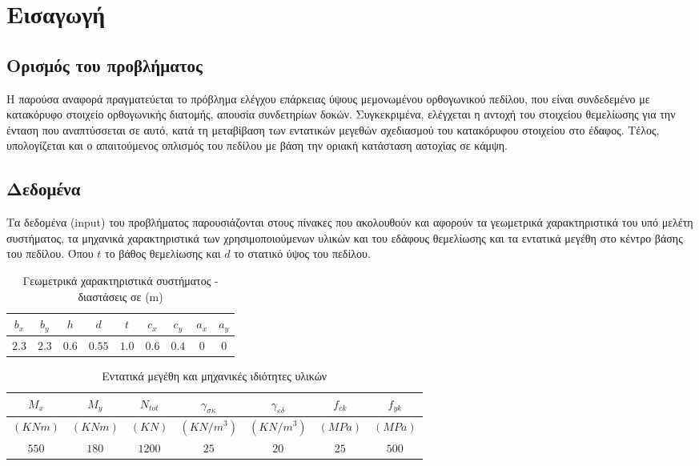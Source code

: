 \pagestyle{fancy}
\chapter{Εισαγωγή}
\section{Ορισμός του προβλήματος}
Η παρούσα αναφορά πραγματεύεται το πρόβλημα ελέγχου επάρκειας ύψους μεμονωμένου ορθογωνικού πεδίλου, που είναι συνδεδεμένο με κατακόρυφο στοιχείο ορθογωνικής διατομής, απουσία συνδετηρίων δοκών. Συγκεκριμένα, ελέγχεται η αντοχή του στοιχείου θεμελίωσης για την ένταση που αναπτύσσεται σε αυτό, κατά τη μεταβίβαση των εντατικών μεγεθών σχεδιασμού του κατακόρυφου στοιχείου στο έδαφος. Τέλος, υπολογίζεται και ο απαιτούμενος οπλισμός του πεδίλου με βάση την οριακή κατάσταση αστοχίας σε κάμψη.

\section{Δεδομένα}
Τα δεδομένα (\textlatin{input}) του προβλήματος παρουσιάζονται στους πίνακες που ακολουθούν και αφορούν τα γεωμετρικά χαρακτηριστικά του υπό μελέτη συστήματος, τα μηχανικά χαρακτηριστικά των χρησιμοποιούμενων υλικών και του εδάφους θεμελίωσης και τα εντατικά μεγέθη στο κέντρο βάσης του πεδίλου. Όπου $t$ το βάθος θεμελίωσης και $d$ το στατικό ύψος του πεδίλου.

\begin{table}[H]
\centering
\begin{tabular}{| c | c | c | c | c | c | c | c | c |}
\hline
$b_x$ & $b_y$ & $h$ & $d$ & $t$ & $c_x$ & $c_y$ & $a_x$ & $a_y$ \\
\hline
$2.3$ & $2.3$ & $0.6$ & $0.55$ & $1.0$ & $0.6$ & $0.4$ & $0$ & $0$ \\
\hline
\end{tabular}
\caption{Γεωμετρικά χαρακτηριστικά συστήματος - διαστάσεις σε (\textlatin{m})}
\label{tab:geometry}
\end{table}

\begin{table}[H]
\centering
\begin{tabular}{| c | c | c | c | c | c | c |}
\hline
$M_x$ & $M_y$ & $N_{tot}$ & ${\gamma}_{\sigma\kappa}$ & ${\gamma}_{\varepsilon\delta}$ & $f_{ck}$ & $f_{yk}$ \\
\hline
$(KNm)$ & $(KNm)$ & $(KN)$ & $(KN/m^3)$ & $(KN/m^3)$ & $(MPa)$ & $(MPa)$ \\
\hline
$550$ & $180$ & $1200$ & $25$ & $20$ & $25$ & $500$ \\
\hline
\end{tabular}
\caption{Εντατικά μεγέθη και μηχανικές ιδιότητες υλικών}
\end{table}

